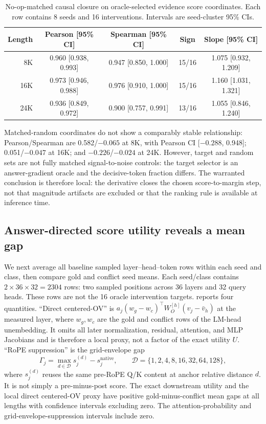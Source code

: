 \begin{table}[t]
  \centering
  \small
  \setlength{\tabcolsep}{5.5pt}
  \caption{No-op-matched causal closure on oracle-selected evidence score
  coordinates.  Each row contains 8 seeds and 16 interventions.  Intervals are
  seed-cluster 95\% CIs.}
  \label{tab:closure}
  \begin{tabular}{@{}rcccc@{}}
    \toprule
    Length & Pearson [95\% CI] & Spearman [95\% CI] & Sign & Slope [95\% CI] \\
    \midrule
    8K  & 0.960 [0.938, 0.993] & 0.947 [0.850, 1.000] & 15/16 & 1.075 [0.932, 1.209] \\
    16K & 0.973 [0.946, 0.988] & 0.976 [0.910, 1.000] & 15/16 & 1.160 [1.031, 1.321] \\
    24K & 0.936 [0.849, 0.972] & 0.900 [0.757, 0.991] & 13/16 & 1.055 [0.846, 1.240] \\
    \bottomrule
  \end{tabular}
\end{table}

Matched-random coordinates do not show a comparably stable relationship:
Pearson/Spearman are 0.582/$-0.065$ at 8K, with Pearson CI
[$-0.288$, 0.948]; 0.051/$-0.047$ at 16K; and $-0.226$/$-0.024$ at 24K.
However, target and random sets are not fully matched signal-to-noise controls:
the target selector is an answer-gradient oracle and the decisive-token fraction
differs.  The warranted conclusion is therefore local: the derivative closes
the chosen score-to-margin step, not that magnitude artifacts are excluded or
that the ranking rule is available at inference time.

\subsection{Answer-directed score utility reveals a mean gap}

We next average all baseline sampled layer--head--token rows within each seed
and class, then compare gold and conflict seed means.  Each seed/class contains
$2\times36\times32=2304$ rows: two sampled positions across 36 layers and 32
query heads.  These rows are not the 16 oracle intervention targets.
 reports four quantities.  ``Direct centered-OV'' is
$a_j(w_g-w_c)^\top W_O^{[h]}(v_j-\bar v_h)$ at the measured layer, where
$w_g,w_c$ are the gold and conflict rows of the LM-head unembedding.  It omits
all later normalization, residual, attention, and MLP Jacobians and is therefore
a local proxy, not a factor of the exact utility $U$.  ``RoPE suppression'' is the
grid-envelope gap
\begin{equation}
  \Gamma_j=\max_{d\in\mathcal D}s_j^{(d)}-s_j^{\mathrm{native}},
  \qquad
  \mathcal D=\{1,2,4,8,16,32,64,128\},
  \label{eq:grid-envelope-suppression}
\end{equation}
where $s_j^{(d)}$ reuses the same pre-RoPE Q/K content at anchor relative
distance $d$.  It is not simply a pre-minus-post score.  The exact downstream
utility and the local direct centered-OV proxy have positive gold-minus-conflict
mean gaps at all lengths with confidence intervals excluding zero.  The
attention-probability and grid-envelope-suppression intervals include zero.

